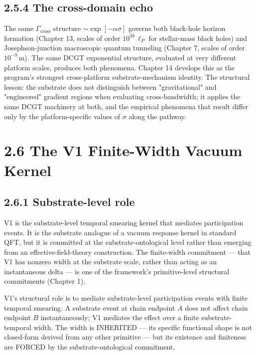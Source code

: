 \documentclass[11pt]{book}
\begin{document}
\subsection{2.5.4 The cross-domain echo}

The same $\Gamma_\mathrm{cross}$ structure $\sim \exp[-\alpha\sigma]$ governs both black-hole horizon formation (Chapter 13, scales of order $10^{38}\,\ell_P$ for stellar-mass black holes) and Josephson-junction macroscopic quantum tunneling (Chapter 7, scales of order $10^{-9}\,\mathrm{m}$). The same DCGT exponential structure, evaluated at very different platform scales, produces both phenomena. Chapter 14 develops this as the program's strongest cross-platform substrate-mechanism identity. The structural lesson: the substrate does not distinguish between "gravitational" and "engineered" gradient regions when evaluating cross-bandwidth; it applies the same DCGT machinery at both, and the empirical phenomena that result differ only by the platform-specific values of $\sigma$ along the pathway.

\section{2.6 The V1 Finite-Width Vacuum Kernel}

\subsection{2.6.1 Substrate-level role}

V1 is the substrate-level temporal smearing kernel that mediates participation events. It is the substrate analogue of a vacuum response kernel in standard QFT, but it is committed at the substrate-ontological level rather than emerging from an effective-field-theory construction. The finite-width commitment — that V1 has nonzero width at the substrate scale, rather than acting as an instantaneous delta — is one of the framework's primitive-level structural commitments (Chapter 1).

V1's structural role is to mediate substrate-level participation events with finite temporal smearing. A substrate event at chain endpoint $A$ does not affect chain endpoint $B$ instantaneously; V1 mediates the effect over a finite substrate-temporal width. The width is INHERITED — its specific functional shape is not closed-form derived from any other primitive — but its existence and finiteness are FORCED by the substrate-ontological commitment.
\end{document}
